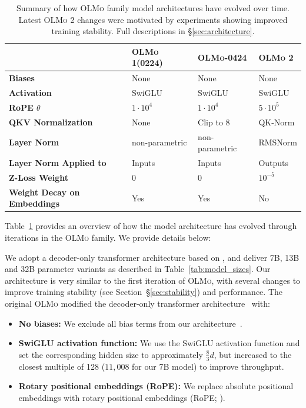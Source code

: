 \documentclass[table]{ai2style/ai2}
\newcommand{\olmo}{\textsc{OLMo}\xspace}
\newcommand{\olmozero}{\textsc{OLMo 1}\xspace}
\newcommand{\olmoapril}{\textsc{OLMo-0424}\xspace}
\newcommand{\olmotoo}{\textsc{OLMo 2}\xspace}
\begin{document}
\begin{table}[h]
    \centering
    \small
    \begin{tabular}{llll}
        \toprule
        & \textbf{\olmozero (0224)} & \textbf{\olmoapril} & \textbf{\olmotoo} \\
        \midrule
        \rowcolor{ai2offwhite}
        \textbf{Biases} & None & None & None \\
        \textbf{Activation} & SwiGLU & SwiGLU & SwiGLU \\
        \rowcolor{ai2offwhite}
        \textbf{RoPE $\theta$} & $1 \cdot 10^{4}$ & $1 \cdot 10^{4}$ & $5 \cdot 10^{5}$ \\
        \textbf{QKV Normalization} & None & Clip to $8$ & QK-Norm \\
        \rowcolor{ai2offwhite}
        \textbf{Layer Norm} & non-parametric & non-parametric & RMSNorm \\
        \textbf{Layer Norm Applied to} & Inputs & Inputs & Outputs \\
        \rowcolor{ai2offwhite}
        \textbf{Z-Loss Weight} & $0$ & $0$ & $10^{-5}$ \\
        \textbf{Weight Decay on Embeddings} & Yes & Yes & No \\
        \bottomrule
    \end{tabular}
    \vspace{1em}
    \caption{Summary of how \olmo family model architectures have evolved over time. Latest \olmotoo changes were motivated by experiments showing improved training stability. 
    Full descriptions in \S\ref{sec:architecture}.}
    \label{tab:model_architecture}
\end{table}

Table~\ref{tab:model_architecture} provides an overview of how the model architecture has evolved through iterations in the \olmo family. We provide details below:

We adopt a decoder-only transformer architecture based on \citet{vaswani2017attention},
and deliver 7B, 13B and 32B parameter variants as described in Table~\ref{tab:model_sizes}.
Our architecture is very similar to the first iteration of \olmo \citep{Groeneveld2024OLMoAT}, with several changes to improve training stability (see Section~\S\ref{sec:stability}) and performance.
The original \olmo modified the decoder-only transformer architecture~\citep{vaswani2017attention} with:
\begin{itemize}
    \item \textbf{No biases:} We exclude all bias terms from our architecture~\citep[\textit{inter alia}]{Groeneveld2024OLMoAT, palm}.
    \item \textbf{SwiGLU activation function:} We use the SwiGLU activation function \citep{Shazeer2020GLUVI} and set the corresponding hidden size to approximately $\frac{8}{3}d$, but increased to the closest multiple of 128 ($11,008$ for our 7B model) to improve throughput.
    \item \textbf{Rotary positional embeddings (RoPE):} We replace absolute positional embeddings with rotary positional embeddings (RoPE; \citealp{Su2021RoFormerET}).
\end{itemize}
\end{document}
